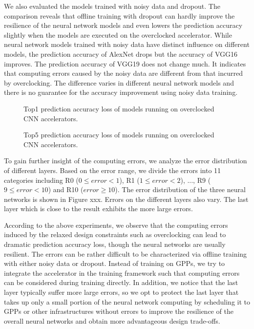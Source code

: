 We also evaluated the models trained with noisy data and dropout. 
The comparison reveals that offline training with dropout can hardly 
improve the resilience of the neural network models and even lowers the 
prediction accuracy slightly when the models are executed on the 
overclocked accelerator. While neural network models trained with 
noisy data have distinct influence on different models, the 
prediction accuracy of AlexNet drops but the accuracy of VGG16 
improves. The prediction accuracy of VGG19 does not change much.
It indicates that computing errors caused by the noisy data are 
different from that incurred by overclocking. The difference varies 
in different neural network models and there is no guarantee 
for the accuracy improvement using noisy data training.

\begin{figure}
    \caption{Top1 prediction accuracy loss of models running on overclocked CNN accelerators.}
\label{fig:top1-loss}
\vspace{-1em}
\end{figure}

\begin{figure}
    \caption{Top5 prediction accuracy loss of models running on overclocked CNN accelerators.}
\label{fig:top5-loss}
\vspace{-1em}
\end{figure}

To gain further insight of the computing errors, we analyze the error distribution 
of different layers. Based on the error range, we divide the errors into 11 categories 
including R0 ($0 \leq error < 1$), R1 ($1 \leq error < 2$), ..., R9 ($9 \leq error < 10$) 
and R10 ($error \geq 10$). The error distribution of the three neural networks is shown in 
Figure xxx. Errors on the different layers also vary. The last layer which is close to the result 
exhibits the more large errors. 

According to the above experiments, we observe that the computing errors induced by the relaxed 
design constraints such as overclocking can lead to dramatic prediction accuracy loss, though 
the neural networks are usually resilient. The errors can be rather difficult to be characterized 
via offline training with either noisy data or dropout. 
Instead of training on GPPs, we try to integrate the accelerator in the training framework 
such that computing errors can be considered during training directly. In addition, we notice 
that the last layer typically suffer more large errors, so we opt to protect the last layer 
that takes up only a small portion of the neural network computing by scheduling it to GPPs 
or other infrastructures without errors to improve the resilience of the overall neural 
networks and obtain more advantageous design trade-offs.

